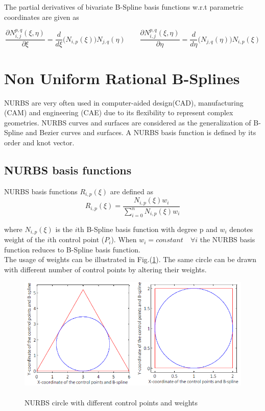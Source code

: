 \documentclass[11pt]{article}
\begin{document}
The partial derivatives of bivariate B-Spline basis functions w.r.t parametric coordinates are given as \cite{nguyen2012introduction}

\begin{equation} 
\frac{\partial N_{i,j}^{p,q}(\xi,\eta)}{\partial \xi} = \frac{d}{d\xi}
\bigg(N_{i,p}(\xi)\bigg)N_{j,q}(\eta) 
\qquad
\frac{\partial N_{i,j}^{p,q}(\xi,\eta)}{\partial \eta} = \frac{d}{d\eta}
\bigg(N_{j,q}(\eta)\bigg)N_{i,p}(\xi)
\end{equation}

\newpage
\section{Non Uniform Rational B-Splines } \label{NURBS}
NURBS are very often used in computer-aided design(CAD), manufacturing (CAM) and engineering (CAE) due to its flexibility to represent complex geometries. NURBS curves and surfaces are considered as the generalization of B-Spline and Bezier curves and surfaces. A NURBS basis function is defined by its order and knot vector.

\subsection{NURBS basis functions}
NURBS basis functions $R_{i,p}(\xi)$ are defined as \cite{piegl2012nurbs}
\begin{equation}\label{NURBSBasisFuncs}
R_{i,p}(\xi) = \frac{N_{i,p}(\xi)w_{i}}{\sum_{i=0}^{n}N_{i,p}(\xi)w_{i}}
\end{equation}

\noindent
where $N_{i,p}(\xi)$ is the $i$th B-Spline basis function with degree p and $w_{i}$ denotes weight of the $i$th control point ($P_i$). When $w_{i} = constant \quad \forall i$ the NURBS basis function reduces to B-Spline basis function. \\The usage of weights can be illustrated in Fig.(\ref{WeightsCircles}). The same circle can be drawn with different number of control points by altering their weights.
\begin{figure}[H]
	\begin{center}
		\includegraphics[scale=0.7]{WeightsCircles.png} 
		\caption{\\NURBS circle with different control points and weights \cite{shah2015stress}}\label{WeightsCircles}
	\end{center}	
\end{figure}
\end{document}
